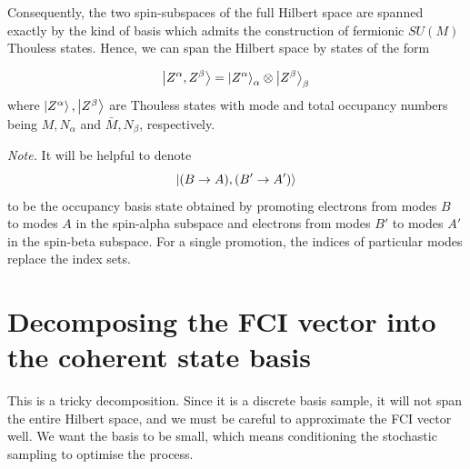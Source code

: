 \documentclass[12pt]{article}
\begin{document}
	Consequently, the two spin-subspaces of the full Hilbert space are spanned exactly by the kind of basis which admits the construction of fermionic $SU(M)$ Thouless states. Hence, we can span the Hilbert space by states of the form
	
	\begin{equation}
	\ket{Z^\alpha, Z^\beta} = \ket{Z^\alpha}_\alpha \otimes \ket{Z^\beta}_\beta
	\end{equation}
	where $\ket{Z^\alpha}, \ket{Z^\beta}$ are Thouless states with mode and total occupancy numbers being $M, N_\alpha$ and $\bar{M}, N_\beta$, respectively.
	
	\textit{Note.} It will be helpful to denote
	\begin{equation}
	\ket{(B \rightarrow A), (B' \rightarrow A')}
	\end{equation}
	to be the occupancy basis state obtained by promoting electrons from modes $B$ to modes $A$ in the spin-alpha subspace and electrons from modes $B'$ to modes $A'$ in the spin-beta subspace. For a single promotion, the indices of particular modes replace the index sets.
	
	\section{Decomposing the FCI vector into the coherent state basis} \label{sec:FCI to CS}
	
	This is a tricky decomposition. Since it is a discrete basis sample, it will not span the entire Hilbert space, and we must be careful to approximate the FCI vector well. We want the basis to be small, which means conditioning the stochastic sampling to optimise the process.
	
\end{document}
